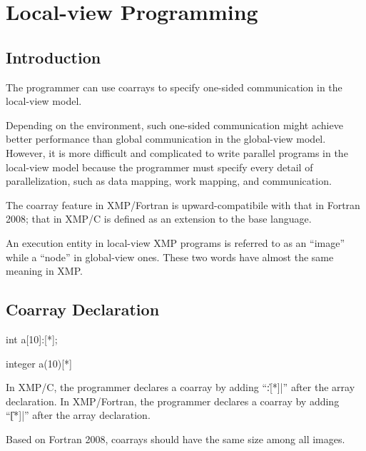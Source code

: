 \section{Local-view Programming}

\subsection{Introduction}

The programmer can use coarrays to specify one-sided communication in
the local-view model.

Depending on the environment, such one-sided communication might achieve
better performance than global communication in the global-view model.
%
However, it is more difficult and complicated to
write parallel programs in the local-view model because the programmer
must specify every detail of
parallelization, such as data mapping, work mapping, and communication.


The coarray feature in XMP/Fortran is upward-compatibile with that in
Fortran 2008; that in XMP/C is defined as an extension to the base
language.

An execution entity in local-view XMP programs is referred to as an 
``image'' while a ``node'' in global-view ones.
%
These two words have almost the same meaning in XMP.

\subsection{Coarray Declaration}

\begin{XCexample}
int a[10]:[*];
\end{XCexample}

\begin{XFexample}
integer a(10)[*]
\end{XFexample}

In XMP/C, the programmer declares a coarray by adding ``\|:[*]|''
after the array declaration. In XMP/Fortran, the programmer declares a
coarray by adding ``\|[*]|'' after the array declaration.

\begin{mynote}
  Based on Fortran 2008, coarrays should have the same size among all
  images.
\end{mynote}

